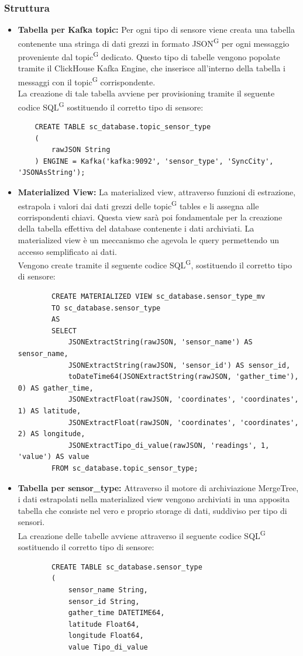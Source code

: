 \documentclass[8pt]{article}
\newcommand{\glossterm}[1]{#1\textsuperscript{G}} %
\begin{document}
\subsubsection{Struttura}
\begin{itemize}
	\setlength\itemsep{0em}
    \item \textbf{Tabella per Kafka topic:} Per ogni tipo di sensore viene creata una tabella contenente una stringa di dati grezzi in formato \glossterm{JSON} per ogni messaggio proveniente dal \glossterm{topic} dedicato. Questo tipo di tabelle vengono popolate tramite il ClickHouse Kafka Engine, che inserisce all’interno della tabella i messaggi con il \glossterm{topic} corrispondente.
    \\La creazione di tale tabella avviene per provisioning tramite il seguente codice \glossterm{SQL} sostituendo il corretto tipo di sensore:
    \begin{verbatim}
    CREATE TABLE sc_database.topic_sensor_type
    (
        rawJSON String
    ) ENGINE = Kafka('kafka:9092', 'sensor_type', 'SyncCity', 'JSONAsString');
    \end{verbatim}
    \item \textbf{Materialized View:} La materialized view, attraverso funzioni di estrazione, estrapola i valori dai dati grezzi delle \glossterm{topic} tables e li assegna alle corrispondenti chiavi. Questa view sarà poi fondamentale per la creazione della tabella effettiva del database contenente i dati archiviati. La materialized view è un meccanismo che agevola le query permettendo un accesso semplificato ai dati. 
    \\Vengono create tramite il seguente codice \glossterm{SQL}, sostituendo il corretto tipo di sensore:
    \begin{verbatim}
        CREATE MATERIALIZED VIEW sc_database.sensor_type_mv
        TO sc_database.sensor_type
        AS
        SELECT
            JSONExtractString(rawJSON, 'sensor_name') AS sensor_name,
            JSONExtractString(rawJSON, 'sensor_id') AS sensor_id,
            toDateTime64(JSONExtractString(rawJSON, 'gather_time'), 0) AS gather_time,
            JSONExtractFloat(rawJSON, 'coordinates', 'coordinates', 1) AS latitude,
            JSONExtractFloat(rawJSON, 'coordinates', 'coordinates', 2) AS longitude,
            JSONExtractTipo_di_value(rawJSON, 'readings', 1, 'value') AS value
        FROM sc_database.topic_sensor_type;
    \end{verbatim}
    \item \textbf{Tabella per sensor\_type:} Attraverso il motore di archiviazione MergeTree, i dati estrapolati nella materialized view vengono archiviati in una apposita tabella che consiste nel vero e proprio storage di dati, suddiviso per tipo di sensori.
    \\La creazione delle tabelle avviene attraverso il seguente codice \glossterm{SQL} sostituendo il corretto tipo di sensore:
    \begin{verbatim}
        CREATE TABLE sc_database.sensor_type
        (
            sensor_name String,
            sensor_id String,
            gather_time DATETIME64,
            latitude Float64,
            longitude Float64,
            value Tipo_di_value
        

\end{verbatim}
\end{itemize}
\end{document}
